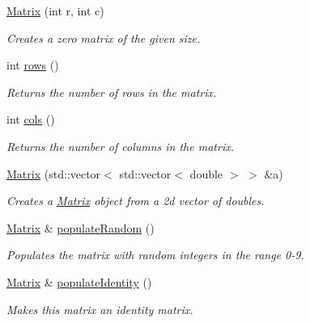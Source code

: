 \begin{DoxyCompactItemize}
\item 
\hyperlink{class_matrix_a07a3cee5bc286ca27ceffe81ce5a2d01}{Matrix} (int r, int c)
\begin{DoxyCompactList}\small\item\em Creates a zero matrix of the given size. \item\end{DoxyCompactList}\item 
int \hyperlink{class_matrix_add9c23e5ff5e2456a8d48024ab19fe96}{rows} ()
\begin{DoxyCompactList}\small\item\em Returns the number of rows in the matrix. \item\end{DoxyCompactList}\item 
int \hyperlink{class_matrix_a35649f43610688d020b2cad91f616d51}{cols} ()
\begin{DoxyCompactList}\small\item\em Returns the number of columns in the matrix. \item\end{DoxyCompactList}\item 
\hyperlink{class_matrix_a0db283ef4ea2660f8d0c1b58f9e74f49}{Matrix} (std::vector$<$ std::vector$<$ double $>$ $>$ \&a)
\begin{DoxyCompactList}\small\item\em Creates a \hyperlink{class_matrix}{Matrix} object from a 2d vector of doubles. \item\end{DoxyCompactList}\item 
\hyperlink{class_matrix}{Matrix} \& \hyperlink{class_matrix_a375fc575a7e042d0eed3d76c7470e59f}{populateRandom} ()
\begin{DoxyCompactList}\small\item\em Populates the matrix with random integers in the range 0-\/9. \item\end{DoxyCompactList}\item 
\hyperlink{class_matrix}{Matrix} \& \hyperlink{class_matrix_a0ee71091770a4e83e54860f291ef1b7d}{populateIdentity} ()
\begin{DoxyCompactList}\small\item\em Makes this matrix an identity matrix. \item\end{DoxyCompactList}\item 

\end{DoxyCompactItemize}
